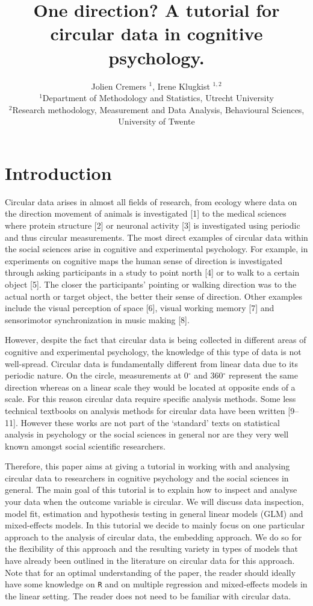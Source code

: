\documentclass[11pt,]{article}
\title{One direction? A tutorial for circular data in cognitive psychology.}
\author{Jolien Cremers \(^1\), Irene Klugkist \(^{1,2}\)\\
\(^1\)Department of Methodology and Statistics, Utrecht University\\
\(^2\)Research methodology, Measurement and Data Analysis, Behavioural
Sciences, University of Twente}
\date{}
\begin{document}
\maketitle

\section{Introduction}\label{Introduction}

Circular data arises in almost all fields of research, from ecology
where data on the direction movement of animals is investigated {[}1{]}
to the medical sciences where protein structure {[}2{]} or neuronal
activity {[}3{]} is investigated using periodic and thus circular
measurements. The most direct examples of circular data within the
social sciences arise in cognitive and experimental psychology. For
example, in experiments on cognitive maps the human sense of direction
is investigated through asking participants in a study to point north
{[}4{]} or to walk to a certain object {[}5{]}. The closer the
participants' pointing or walking direction was to the actual north or
target object, the better their sense of direction. Other examples
include the visual perception of space {[}6{]}, visual working memory
{[}7{]} and sensorimotor synchronization in music making {[}8{]}.

However, despite the fact that circular data is being collected in
different areas of cognitive and experimental psychology, the knowledge
of this type of data is not well-spread. Circular data is fundamentally
different from linear data due to its periodic nature. On the circle,
measurements at 0\(^\circ\) and 360\(^\circ\) represent the same
direction whereas on a linear scale they would be located at opposite
ends of a scale. For this reason circular data require specific analysis
methods. Some less technical textbooks on analysis methods for circular
data have been written {[}9--11{]}. However these works are not part of
the `standard' texts on statistical analysis in psychology or the social
sciences in general nor are they very well known amongst social
scientific researchers.

Therefore, this paper aims at giving a tutorial in working with and
analysing circular data to researchers in cognitive psychology and the
social sciences in general. The main goal of this tutorial is to explain
how to inspect and analyse your data when the outcome variable is
circular. We will discuss data inspection, model fit, estimation and
hypothesis testing in general linear models (GLM) and mixed-effects
models. In this tutorial we decide to mainly focus on one particular
approach to the analysis of circular data, the embedding approach. We do
so for the flexibility of this approach and the resulting variety in
types of models that have already been outlined in the literature on
circular data for this approach. Note that for an optimal understanding
of the paper, the reader should ideally have some knowledge on \verb|R|
and on multiple regression and mixed-effects models in the linear
setting. The reader does not need to be familiar with circular data.
\end{document}
